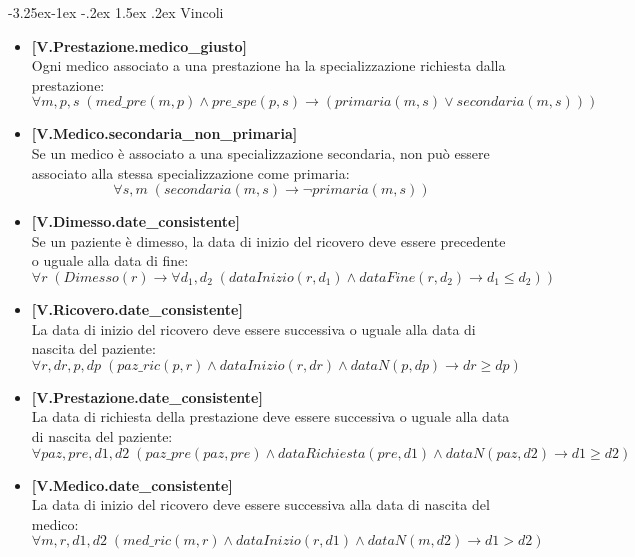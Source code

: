\documentclass{article}
\makeatletter
\renewcommand\subsection{\@startsection{subsection}{2}{\z@}%
                                     {-3.25ex\@plus-1ex \@minus-.2ex}%
                                     {1.5ex \@plus.2ex}%
                                     {\normalfont\normalsize\bfseries}}
\makeatother
\begin{document}
\newpage

\subsection{Vincoli}

\begin{itemize}
    \item \textbf{[V.Prestazione.medico\_giusto]}\\
    Ogni medico associato a una prestazione ha la specializzazione richiesta dalla prestazione:
    \[
    \forall m,p,s \; (med\_pre(m,p) \land pre\_spe(p,s) \rightarrow (primaria(m,s) \lor secondaria(m,s)))
    \]
    
    \item \textbf{[V.Medico.secondaria\_non\_primaria]}\\
    Se un medico è associato a una specializzazione secondaria, non può essere associato alla stessa specializzazione come primaria:
    \[
    \forall s,m \; (secondaria(m,s) \rightarrow \neg primaria(m,s))
    \]
    
    \item \textbf{[V.Dimesso.date\_consistente]}\\
    Se un paziente è dimesso, la data di inizio del ricovero deve essere precedente o uguale alla data di fine:
    \[
    \forall r \; (Dimesso(r) \rightarrow \forall d_1,d_2 \; (dataInizio(r,d_1) \land dataFine(r,d_2) \rightarrow d_1 \leq d_2))
    \]
    
    \item \textbf{[V.Ricovero.date\_consistente]}\\
    La data di inizio del ricovero deve essere successiva o uguale alla data di nascita del paziente:
    \[
    \forall r,dr,p,dp \; (paz\_ric(p,r) \land dataInizio(r,dr) \land dataN(p,dp) \rightarrow dr \geq dp)
    \]
    
    \item \textbf{[V.Prestazione.date\_consistente]}\\
    La data di richiesta della prestazione deve essere successiva o uguale alla data di nascita del paziente:
    \[
    \forall paz,pre,d1,d2 \; (paz\_pre(paz,pre) \land dataRichiesta(pre,d1) \land dataN(paz,d2) \rightarrow d1 \geq d2)
    \]
    
    \item \textbf{[V.Medico.date\_consistente]}\\
    La data di inizio del ricovero deve essere successiva alla data di nascita del medico:
    \[
    \forall m,r,d1,d2 \; (med\_ric(m,r) \land dataInizio(r,d1) \land dataN(m,d2) \rightarrow d1 > d2)
    \]
    

\end{itemize}
\end{document}
